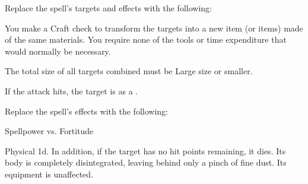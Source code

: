 Replace the spell's targets and effects with the following:
\begin{spellcontent}

\begin{augmenttargetinginfo}



\end{augmenttargetinginfo}


\begin{augmenteffects}



\spelleffect
You make a Craft check to transform the targets into a new item (or items) made of the same materials.
You require none of the tools or time expenditure that would normally be necessary.

The total size of all targets combined must be Large size or smaller.








\end{augmenteffects}

\end{spellcontent}






If the attack hits, the target is  as a .









Replace the spell's effects with the following:
\begin{spellcontent}

\begin{augmenteffects}




\begin{spellattack}{Spellpower vs. Fortitude}


\spellsuccess
Physical  \plus1d.
In addition, if the target has no hit points remaining, it dies.
Its body is completely disintegrated, leaving behind only a pinch of fine dust.
Its equipment is unaffected.



\end{spellattack}





\end{augmenteffects}

\end{spellcontent}





